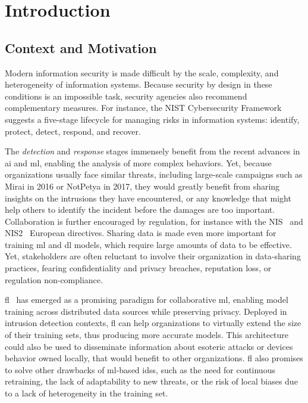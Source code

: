 \chapter{Introduction\label{chap:intro}}
\localtoc

\section{Context and Motivation\label{sec:intro.context}}

Modern information security is made difficult by the scale, complexity, and heterogeneity of information systems.
Because security by design in these conditions is an impossible task, security agencies also recommend complementary measures.
For instance, the NIST Cybersecurity Framework~\cite{nationalinstituteofstandardsandtechnology_NISTCybersecurityFramework_2024} suggests a five-stage lifecycle for managing risks in information systems: identify, protect, detect, respond, and recover.

The \emph{detection} and \emph{response} stages immensely benefit from the recent advances in \gls{ai} and \gls{ml}, enabling the analysis of more complex behaviors.
Yet, because organizations usually face similar threats, including large-scale campaigns such as Mirai in 2016 or NotPetya in 2017, they would greatly benefit from sharing insights on the intrusions they have encountered, or any knowledge that might help others to identify the incident before the damages are too important.
Collaboration is further encouraged by regulation, for instance with the NIS~\cite{NIS_directive} and NIS2~\cite{NIS2} European directives.
Sharing data is made even more important for training \gls{ml} and \gls{dl} models, which require large amounts of data to be effective.
Yet, stakeholders are often reluctant to involve their organization in data-sharing practices, fearing confidentiality and privacy breaches, reputation loss, or regulation non-compliance.

\Gls{fl}~\cite{mcmahan_Communicationefficientlearningdeep_2017} has emerged as a promising paradigm for collaborative \gls{ml}, enabling model training across distributed data sources while preserving privacy.
Deployed in intrusion detection contexts, \gls{fl} can help organizations to virtually extend the size of their training sets, thus producing more accurate models.
This architecture could also be used to disseminate information about esoteric attacks or devices behavior owned locally, that would benefit to other organizations.
\Gls{fl} also promises to solve other drawbacks of \gls{ml}-based \glspl{ids}, such as the need for continuous retraining\needref, the lack of adaptability to new threats\needref, or the risk of local biases due to a lack of heterogeneity in the training set\needref.

